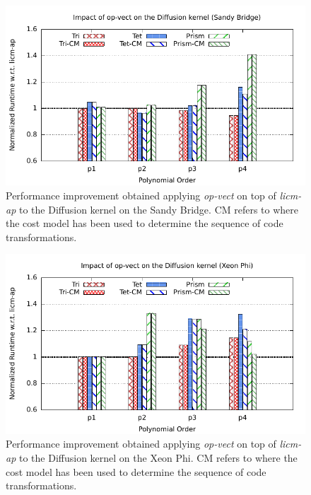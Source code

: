 \documentclass[conference]{IEEEtran}
\begin{document}
\begin{figure}[h]
\begin{center}
\includegraphics[scale=0.65]{Pictures/diffusion-normalized-opvect.pdf}
\end{center}
\caption{Performance improvement obtained applying \emph{op-vect} on top of \emph{licm-ap} to the Diffusion kernel on the Sandy Bridge. CM refers to where the cost model has been used to determine the sequence of code transformations.}
\label{fig:opvect-diffusion-speedup}
\end{figure}

\begin{figure}[h]
\begin{center}
\includegraphics[scale=0.65]{Pictures/diffusion-normalized-opvect-phi.pdf}
\end{center}
\caption{Performance improvement obtained applying \emph{op-vect} on top of \emph{licm-ap} to the Diffusion kernel on the Xeon Phi. CM refers to where the cost model has been used to determine the sequence of code transformations.}
\label{fig:opvect-diffusion-speedup-phi}
\end{figure}
\end{document}
